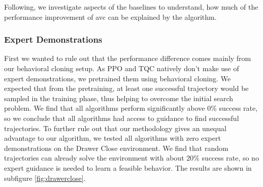 Following, we investigate aspects of the baselines to understand, how much of the performance improvement of \ac{avc} can be explained by the algorithm. 

\subsubsection{Expert Demonstrations}
First we wanted to rule out that the performance difference comes mainly from our behavioral cloning setup. As PPO and TQC natively don't make use of expert demonstrations,
we pretrained them using behavioral cloning. We expected that from the pretraining, at least one successful trajectory would be sampled in the training phase, thus
helping to overcome the initial search problem. We find that all algorithms perform significantly above $0\%$ success rate, so we conclude that all algorithms had
access to guidance to find successful trajectories. To further rule out that our methodology gives an unequal advantage to our algorithm, we tested all algorithms with 
zero expert demonstrations on the 
Drawer Close environment. We find that random trajectories can already solve the environment with about $20\%$ success rate, so no expert guidance is needed to learn a feasible behavior.
The results are shown in subfigure \ref{fig:drawerclose}.\\ 

